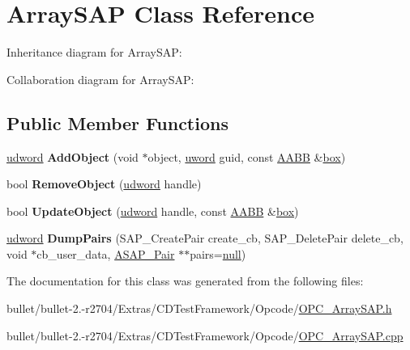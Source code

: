 \hypertarget{class_array_s_a_p}{\section{Array\+S\+A\+P Class Reference}
\label{class_array_s_a_p}
}


Inheritance diagram for Array\+S\+A\+P\+:


Collaboration diagram for Array\+S\+A\+P\+:
\subsection*{Public Member Functions}
\begin{DoxyCompactItemize}
\item 
\hypertarget{class_array_s_a_p_aed8ee992f71edec7276dc49314a60331}{\hyperlink{_ice_types_8h_a44c6f1920ba5551225fb534f9d1a1733}{udword} {\bfseries Add\+Object} (void $\ast$object, \hyperlink{_ice_types_8h_a42fa576a6a3b73c1efc32ab91d176300}{uword} guid, const \hyperlink{class_a_a_b_b}{A\+A\+B\+B} \&\hyperlink{structbox}{box})}\label{class_array_s_a_p_aed8ee992f71edec7276dc49314a60331}

\item 
\hypertarget{class_array_s_a_p_a61532102f10f16c59b1bcc0349d743e1}{bool {\bfseries Remove\+Object} (\hyperlink{_ice_types_8h_a44c6f1920ba5551225fb534f9d1a1733}{udword} handle)}\label{class_array_s_a_p_a61532102f10f16c59b1bcc0349d743e1}

\item 
\hypertarget{class_array_s_a_p_a4e6392f61f9e54768bb08d27e6bb755f}{bool {\bfseries Update\+Object} (\hyperlink{_ice_types_8h_a44c6f1920ba5551225fb534f9d1a1733}{udword} handle, const \hyperlink{class_a_a_b_b}{A\+A\+B\+B} \&\hyperlink{structbox}{box})}\label{class_array_s_a_p_a4e6392f61f9e54768bb08d27e6bb755f}

\item 
\hypertarget{class_array_s_a_p_ac88bcf97aced0cf27f3128fab03363f5}{\hyperlink{_ice_types_8h_a44c6f1920ba5551225fb534f9d1a1733}{udword} {\bfseries Dump\+Pairs} (S\+A\+P\+\_\+\+Create\+Pair create\+\_\+cb, S\+A\+P\+\_\+\+Delete\+Pair delete\+\_\+cb, void $\ast$cb\+\_\+user\+\_\+data, \hyperlink{struct_a_s_a_p___pair}{A\+S\+A\+P\+\_\+\+Pair} $\ast$$\ast$pairs=\hyperlink{_ice_types_8h_ac97b8ee753e4405397a42ad5799b0f9e}{null})}\label{class_array_s_a_p_ac88bcf97aced0cf27f3128fab03363f5}

\end{DoxyCompactItemize}


The documentation for this class was generated from the following files\+:\begin{DoxyCompactItemize}
\item 
bullet/bullet-\/2.-\/r2704/\+Extras/\+C\+D\+Test\+Framework/\+Opcode/\hyperlink{_o_p_c___array_s_a_p_8h}{O\+P\+C\+\_\+\+Array\+S\+A\+P.\+h}\item 
bullet/bullet-\/2.-\/r2704/\+Extras/\+C\+D\+Test\+Framework/\+Opcode/\hyperlink{_o_p_c___array_s_a_p_8cpp}{O\+P\+C\+\_\+\+Array\+S\+A\+P.\+cpp}\end{DoxyCompactItemize}
